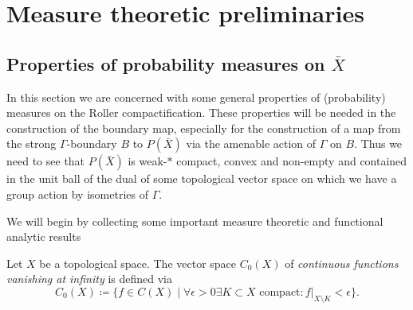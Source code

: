 \section{Measure theoretic preliminaries}
\label{sec:measure}

\subsection{Properties of probability measures on \(\bar X\)}
\label{sec:prob}

In this section we are concerned with some general properties of (probability) measures on the Roller compactification. These properties will be needed in the construction of the boundary map, especially for the construction of a map from the strong \(\Gamma\)-boundary \(B\) to \(P(\bar X)\) via the amenable action of \(\Gamma\) on \(B\). Thus we need to see that \(P(\bar X)\) is weak-\(\ast\) compact, convex and non-empty and contained in the unit ball of the dual of some topological vector space on which we have a group action by isometries of \(\Gamma\).

We will begin by collecting some important measure theoretic and functional analytic results

\begin{defin}
  \label{def:vanishing}
  Let \(X\) be a topological space. The vector space \(C_0(X)\) of \emph{continuous functions vanishing at infinity} is defined via
  \[
    C_0(X) \coloneqq \{f \in C(X) \mid \forall \epsilon > 0 \exists K \subset X \text{ compact}\colon f|_{X\setminus K} < \epsilon\}.
  \]
\end{defin}

